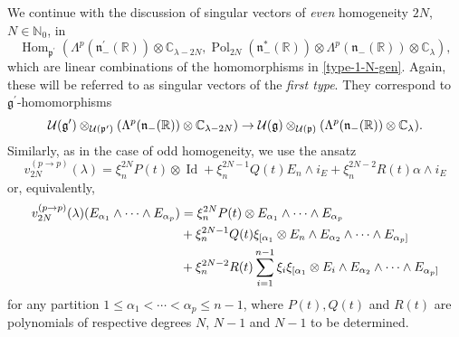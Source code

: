 \documentclass[a4paper,12pt,reqno]{amsart}
\numberwithin{theorem}{subsection}
\numberwithin{equation}{section}
\begin{document}
We continue with the discussion of singular vectors of {\em even} homogeneity
$2N$, $N \in {\mathbb{N}}_0$, in
$$
   {\operatorname{Hom}}_{{{\mathfrak p}}^\prime}(\Lambda^{p}({{\mathfrak n}}_-^\prime({\mathbb{R}})) \otimes {\mathbb{C}}_{\lambda-2N},
   {\operatorname{Pol}}_{2N}({{\mathfrak n}}_-^*({\mathbb{R}})) \otimes \Lambda^p({{\mathfrak n}}_-({\mathbb{R}})) \otimes {\mathbb{C}}_\lambda),
$$
which are linear combinations of the homomorphisms in \eqref{type-1-N-gen}.
Again, these will be referred to as singular vectors of the {\em first type}.
They correspond to ${{\mathfrak g}}^\prime$-homomorphisms
\begin{equation*}
   {\fam2 U}({{\mathfrak g}}^\prime)\otimes_{{\fam2 U}({{\mathfrak p}}^\prime)}(\Lambda^p({{\mathfrak n}}_-({\mathbb{R}}))
   \otimes{\mathbb{C}}_{\lambda-2N}) \to{\fam2 U}({{\mathfrak g}})\otimes_{{\fam2 U}({{\mathfrak p}})}(\Lambda^p({{\mathfrak n}}_-({\mathbb{R}})) \otimes {\mathbb{C}}_\lambda).
\end{equation*}
Similarly, as in the case of odd homogeneity, we use the ansatz
\begin{equation*}
   v_{2N}^{(p\to p)}(\lambda) =
   \xi_n^{2N} P(t) \otimes {\operatorname{Id}} + \xi_n^{2N-1} Q(t) E_n \wedge i_E + \xi_n^{2N-2} R(t) \alpha \wedge i_E
\end{equation*}
or, equivalently,
\begin{align}\label{ansatz-even2}
    v_{2N}^{(p\to p)}(\lambda)(E_{\alpha_1}\wedge\cdots\wedge E_{\alpha_p})
    & = \xi_n^{2N} P(t)\otimes E_{\alpha_1}\wedge\cdots\wedge E_{\alpha_p}  \notag \\
    & + \xi_n^{2N-1} Q(t)\xi_{[\alpha_1}\otimes E_n\wedge E_{\alpha_2}\wedge\cdots\wedge E_{\alpha_p]} \notag \\
    & + \xi_n^{2N-2} R(t)\sum_{i=1}^{n-1}\xi_i\xi_{[\alpha_1}
    \otimes E_i\wedge E_{\alpha_2}\wedge\cdots\wedge E_{\alpha_p]}
\end{align}
for any partition $1\leq \alpha_1 < \cdots <\alpha_{p} \leq n-1$, where $P(t),
Q(t)$ and $R(t)$ are polynomials of respective degrees $N$, $N-1$ and $N-1$ to
be determined.
\end{document}
